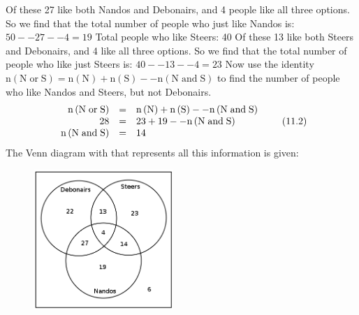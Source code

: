 {\begin{mdframed}[linewidth=4, leftmargin=40, rightmargin=40]
\begin{exercise}
\begin{enumerate}[noitemsep, label=\textbf{Step} \textbf{\arabic*}. ]
Of these 27 like both Nandos and Debonairs, and 4 people like all three options. So we find that the total number of people who just like Nandos is: $50--27--4=19$\newline
Total people who like Steers: 40\newline
Of these 13 like both Steers and Debonairs, and 4 like all three options. So we find that the total number of people who like just Steers is: $40--13--4=23$\newline
Now use the identity $\mathrm{n\left(N\; or\; S\right)}=\mathrm{n\left(N\right)}+\mathrm{n\left(S\right)}--\mathrm{n\left(N\; and\; S\right)}$ to find the number of people who like Nandos and Steers, but not Debonairs.
\label{m39377*id734}\nopagebreak\noindent{}
    \begin{equation}
    \begin{array}{ccc}\hfill \mathrm{n\left(N\; or\; S\right)}& =& \mathrm{n\left(N\right)}+\mathrm{n\left(S\right)}--\mathrm{n\left(N\; and\; S\right)}\hfill \\ \hfill 28& =& 23+19--\mathrm{n\left(N\; and\; S\right)}\hfill \\ \hfill \mathrm{n\left(N\; and\; S\right)}& =& 14\hfill \end{array}\tag{11.2}
      \end{equation}
The Venn diagram with that represents all this information is given:
    \setcounter{subfigure}{0}
	\begin{figure}[H] %
    \begin{center}
    \label{m39377*id1106!!!underscore!!!media}\label{m39377*id1106!!!underscore!!!printimage}\includegraphics[width=200px]{col11306.imgs/m39377_Vennwex3.png} %
      \vspace{2pt}
    \vspace{.1in}
    \end{center}
 \end{figure}       
\end{enumerate}
    \end{exercise}
    \end{mdframed}
    }
    \noindent
\label{m39377*eip-796}
